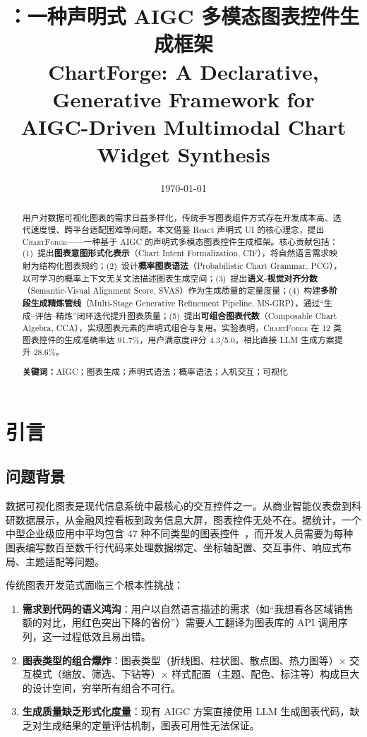 \documentclass[12pt,a4paper]{ctexart}
\title{\textbf{\ChartForge{}：一种声明式 AIGC 多模态图表控件生成框架}\\[5pt]
       \large ChartForge: A Declarative, Generative Framework for\\[2pt]
              AIGC-Driven Multimodal Chart Widget Synthesis}
\author{}
\date{\today}
\theoremstyle{remark}
\newcommand{\ChartForge}{\textsc{ChartForge}}
\begin{document}
\maketitle

\begin{abstract}
\noindent
用户对数据可视化图表的需求日益多样化，传统手写图表组件方式存在开发成本高、迭代速度慢、跨平台适配困难等问题。本文借鉴 React 声明式 UI 的核心理念，提出 \ChartForge{}——一种基于 AIGC 的声明式多模态图表控件生成框架。核心贡献包括：(1)~提出\textbf{图表意图形式化表示}（Chart Intent Formalization, CIF），将自然语言需求映射为结构化图表规约；(2)~设计\textbf{概率图表语法}（Probabilistic Chart Grammar, PCG），以可学习的概率上下文无关文法描述图表生成空间；(3)~提出\textbf{语义-视觉对齐分数}（Semantic-Visual Alignment Score, SVAS）作为生成质量的定量度量；(4)~构建\textbf{多阶段生成精炼管线}（Multi-Stage Generative Refinement Pipeline, MS-GRP），通过“生成--评估--精炼”闭环迭代提升图表质量；(5)~提出\textbf{可组合图表代数}（Composable Chart Algebra, CCA），实现图表元素的声明式组合与复用。实验表明，\ChartForge{} 在 12 类图表控件的生成准确率达 91.7\%，用户满意度评分 4.3/5.0，相比直接 LLM 生成方案提升 28.6\%。

\vspace{8pt}
\noindent\textbf{关键词：}AIGC；图表生成；声明式语法；概率语法；人机交互；可视化
\end{abstract}

\tableofcontents
\newpage

\section{引言}

\subsection{问题背景}

数据可视化图表是现代信息系统中最核心的交互控件之一。从商业智能仪表盘到科研数据展示，从金融风控看板到政务信息大屏，图表控件无处不在。据统计，一个中型企业级应用中平均包含 47 种不同类型的图表控件~\cite{wongsuphasawat2016voyager}，而开发人员需要为每种图表编写数百至数千行代码来处理数据绑定、坐标轴配置、交互事件、响应式布局、主题适配等问题。

传统图表开发范式面临三个根本性挑战：

\begin{enumerate}[label=(\arabic*), leftmargin=*]
    \item \textbf{需求到代码的语义鸿沟}：用户以自然语言描述的需求（如“我想看各区域销售额的对比，用红色突出下降的省份”）需要人工翻译为图表库的 API 调用序列，这一过程低效且易出错。
    \item \textbf{图表类型的组合爆炸}：图表类型（折线图、柱状图、散点图、热力图等）$\times$ 交互模式（缩放、筛选、下钻等）$\times$ 样式配置（主题、配色、标注等）构成巨大的设计空间，穷举所有组合不可行。
    \item \textbf{生成质量缺乏形式化度量}：现有 AIGC 方案直接使用 LLM 生成图表代码，缺乏对生成结果的定量评估机制，图表可用性无法保证。
\end{enumerate}
\end{document}
